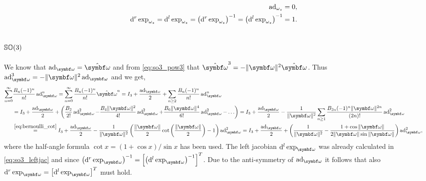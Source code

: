 \begin{properties}[title={Lowercase adjoint and exponential derivatives on $\SOtwo$}]
  \begin{align}
    \operatorname{ad}_{\omega_z} = 0, \\
    \mathrm{d}^r \exp_{\omega_z} =
    \mathrm{d}^l \exp_{\omega_z} =
    \left( \mathrm{d}^r \exp_{\omega_z} \right)^{-1} =
    \left( \mathrm{d}^l \exp_{\omega_z} \right)^{-1} = 1.
  \end{align}
\end{properties}

\subsection{\texorpdfstring{${\mathbb{SO}(3)}$}{SO(3)}}

We know that $\ad_\bomega = \hat \bomega$ and from \eqref{eq:so3_pow3} that $\hat \bomega^3 = - \| \bomega \|^2 \hat \bomega$. Thus $\ad_\bomega^3 = -\| \bomega \|^2 \ad_\bomega$ and we get,
\begin{equation*}
  \begin{aligned}
    \sum_{n=0}^\infty
     &
    \frac{B_n (-1)^n}{n!} \ad_\bomega^n
    = \sum_{n=0}^\infty \frac{B_n (-1)^n}{n!} \hat \bomega^n = I_3 + \frac{\ad_\bomega}{2} + \sum_{n \geq 2} \frac{B_n (-1)^n}{n!}\ad_\bomega^n                                                                                                                                                                                                                    \\
     & = I_3 + \frac{\ad_\bomega}{2} + \left( \frac{B_2}{2!}\ad_\bomega^2 - \frac{B_4 \| \bomega \|^2} {4!} \ad_\bomega^2 + \frac{B_6 \| \bomega \|^4}{6!} \ad_\bomega^2 - \ldots \right) = I_3 + \frac{\ad_\bomega}{2} - \frac{1}{\| \bomega \|^2} \sum_{n \geq 1} \frac{B_{2n} (-1)^n \| \bomega \|^{2n}}{(2n)!} \ad_\bomega^2                                   \\
     & \overset{\eqref{eq:bernoulli_cot}}= I_3 + \frac{\ad_\bomega}{2} - \frac{1}{\| \bomega \|^2} \left( \frac{\| \bomega \|}{2} \cot \left( \frac{\| \bomega \|}{2} \right) - 1 \right) \ad_\bomega^2 = I_3 + \frac{\ad_\bomega}{2} + \left( \frac{1}{\| \bomega \|^2} - \frac{1 + \cos \| \bomega \| }{2 \|\bomega \| \sin \|\bomega \|} \right) \ad_\bomega^2,
  \end{aligned}
\end{equation*}
where the half-angle formula $\cot x = (1 + \cos x) / \sin x$ has been used. The left jacobian $\mathrm{d}^l \exp_\bomega$ was already calculated in \eqref{eq:so3_leftjac} and since $\left( \mathrm{d}^r \exp_{\bomega} \right)^{-1} = \left[ \left( \mathrm{d}^l \exp_{\bomega} \right)^{-1} \right]^T$. Due to the anti-symmetry of $\ad_\bomega$ it follows that also $\mathrm{d}^r \exp_\bomega = \left[ \mathrm{d}^l \exp_\bomega \right]^T$ must hold.

